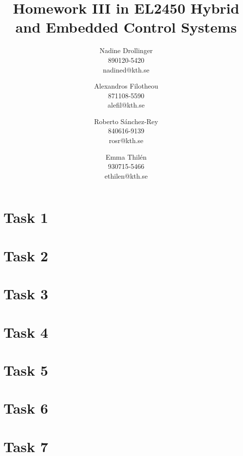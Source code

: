 \documentclass[a4paper,12pt,oneside,onecolumn]{article} %
\begin{document}

\title{Homework III in EL2450 Hybrid and Embedded Control Systems}
\author{
  Nadine Drollinger \\ 890120-5420 \\ nadined@kth.se
  \and
  Alexandros Filotheou \\ 871108-5590 \\ alefil@kth.se
  \and
  Roberto Sánchez-Rey \\ 840616-9139 \\ rosr@kth.se
  \and
  Emma Thilén \\ 930715-5466 \\ ethilen@kth.se
  }
\date{}

\maketitle                     %


\section*{Task 1}


\section*{Task 2}


\section*{Task 3}


\section*{Task 4}


\section*{Task 5}


\section*{Task 6}


\section*{Task 7}

\end{document}
